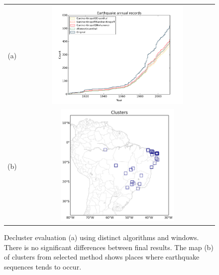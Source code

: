 \documentclass[draft, grl]{agutex}
\begin{document}
\begin{figure}
	\begin{center}
	\begin{table}[H]
		\begin{tabular}{ c c }
		\footnotesize(a)
		& \includegraphics[width=0.70\textwidth]{z_img_hmtk_bsb2014_11_decluster}
		\\
		\footnotesize(b)
        & \includegraphics[width=0.60\textwidth]{z_img_hmtk_bsb2014_11_clusters}
		\end{tabular}
	\end{table}
	\caption{Decluster evaluation (a) using distinct algorithms and windows. There is no significant differences between final results. The map (b) of clusters from selected method shows places where earthquake sequences tends to occur.}
	\label{fig_decluster}
	\end{center}
\end{figure}
\end{document}

